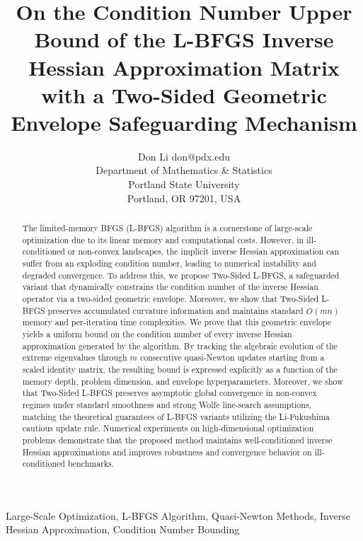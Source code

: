 \documentclass[twoside,11pt]{article}
\begin{document}
\title{On the Condition Number Upper Bound of the L-BFGS Inverse Hessian Approximation Matrix with a Two-Sided Geometric Envelope Safeguarding Mechanism}

\author{\name Don Li \email don@pdx.edu \\
       \addr Department of Mathematics \& Statistics\\
       Portland State University \\
       Portland, OR 97201, USA}


\maketitle

\begin{abstract}
The limited-memory BFGS (L-BFGS) algorithm is a cornerstone of large-scale optimization due to its linear memory and computational costs. However, in ill-conditioned or non-convex landscapes, the implicit inverse Hessian approximation can suffer from an exploding condition number, leading to numerical instability and degraded convergence. To address this, we propose Two-Sided L-BFGS, a safeguarded variant that dynamically constrains the condition number of the inverse Hessian operator via a two-sided geometric envelope. Moreover, we show that Two-Sided L-BFGS preserves accumulated curvature information and maintains standard $O(mn)$ memory and per-iteration time complexities. We prove that this geometric envelope yields a uniform bound on the condition number of every inverse Hessian approximation generated by the algorithm. By tracking the algebraic evolution of the extreme eigenvalues through $m$ consecutive quasi-Newton updates starting from a scaled identity matrix, the resulting bound is expressed explicitly as a function of the memory depth, problem dimension, and envelope hyperparameters. Moreover, we show that Two-Sided L-BFGS preserves asymptotic global convergence in non-convex regimes under standard smoothness and strong Wolfe line-search assumptions, matching the theoretical guarantees of L-BFGS variants utilizing the Li-Fukushima cautious update rule. Numerical experiments on high-dimensional optimization problems demonstrate that the proposed method maintains well-conditioned inverse Hessian approximations and improves robustness and convergence behavior on ill-conditioned benchmarks.
\end{abstract}

\begin{keywords}
Large-Scale Optimization, L-BFGS Algorithm, Quasi-Newton Methods, Inverse Hessian Approximation, Condition Number Bounding
\end{keywords}
\end{document}
